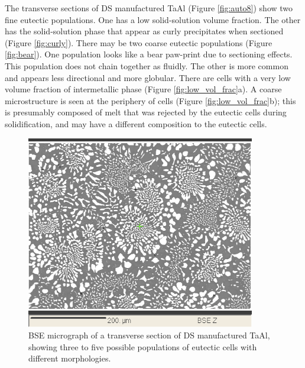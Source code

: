 The transverse sections of DS manufactured TaAl (Figure \ref{fig:auto8}) show two fine eutectic populations.  One has a low solid-solution volume fraction.  The other has the solid-solution phase that appear as curly precipitates when sectioned (Figure \ref{fig:curly}).  There may be two coarse eutectic populations (Figure \ref{fig:bear}).  One population looks like a bear paw-print due to sectioning effects.  This population does not chain together as fluidly.  The other is more common and appears less directional and more globular.  There are cells with a very low volume fraction of intermetallic phase (Figure \ref{fig:low_vol_frac}a).  A coarse microstructure is seen at the periphery of cells (Figure \ref{fig:low_vol_frac}b); this is presumably composed of melt that was rejected by the eutectic cells during solidification, and may have a different composition to the eutectic cells.
%
\begin{figure}[htbp]
\begin{center}
\includegraphics[width=10cm]{auto7_eut_pop}
\caption{BSE micrograph of a transverse section of DS manufactured TaAl, showing three to five possible populations of eutectic cells with different morphologies.}\label{fig:trans_forest}
\end{center}
\end{figure}
